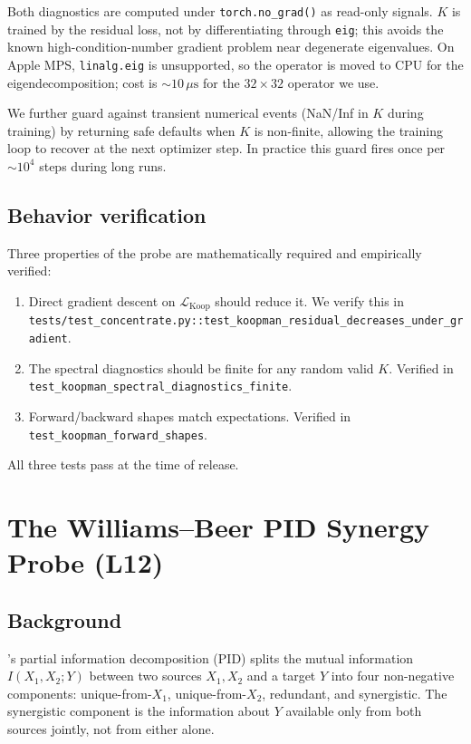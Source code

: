 \documentclass[11pt]{article}
\begin{document}
Both diagnostics are computed under \texttt{torch.no\_grad()} as
read-only signals. $K$ is trained by the residual loss, not by
differentiating through \texttt{eig}; this avoids the known
high-condition-number gradient problem near degenerate eigenvalues. On
Apple MPS, \texttt{linalg.eig} is unsupported, so the operator is moved
to CPU for the eigendecomposition; cost is $\sim 10\,\mu\text{s}$ for the
$32 \times 32$ operator we use.

We further guard against transient numerical events (NaN/Inf in $K$
during training) by returning safe defaults when $K$ is non-finite,
allowing the training loop to recover at the next optimizer step. In
practice this guard fires once per $\sim 10^4$ steps during long runs.

\subsection{Behavior verification}

Three properties of the probe are mathematically required and empirically
verified:

\begin{enumerate}
\item Direct gradient descent on $\mathcal{L}_{\text{Koop}}$ should
reduce it. We verify this in
\texttt{tests/test\_concentrate.py::test\_koopman\_residual\_decreases\_under\_gradient}.
\item The spectral diagnostics should be finite for any random valid $K$.
Verified in
\texttt{test\_koopman\_spectral\_diagnostics\_finite}.
\item Forward/backward shapes match expectations. Verified in
\texttt{test\_koopman\_forward\_shapes}.
\end{enumerate}

All three tests pass at the time of release.

\section{The Williams--Beer PID Synergy Probe (L12)}
\label{sec:iit_pid}

\subsection{Background}

\citet{williams2010nonnegative}'s partial information decomposition (PID)
splits the mutual information $I(X_1, X_2; Y)$ between two sources
$X_1, X_2$ and a target $Y$ into four non-negative components:
unique-from-$X_1$, unique-from-$X_2$, redundant, and synergistic. The
synergistic component is the information about $Y$ available only from
both sources jointly, not from either alone.
\end{document}
